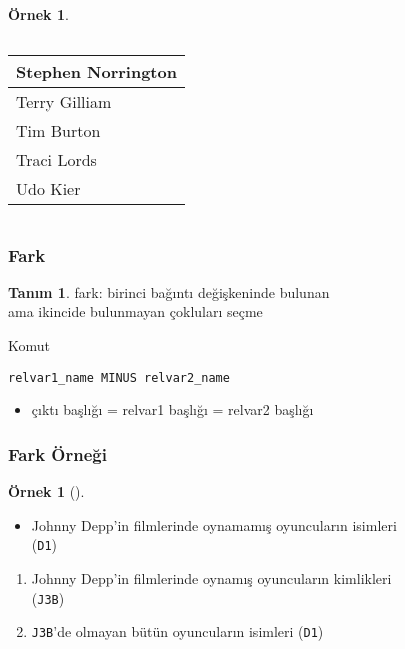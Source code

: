 \documentclass[dvipsnames]{beamer}
\theoremstyle{definition}
\newtheorem{tanim}[theorem]{Tanım}
\theoremstyle{example}
\newtheorem{ornek}[theorem]{Örnek}
\theoremstyle{plain}
\begin{document}
\begin{frame}[fragile]
\begin{ornek}
\begin{columns}[b]
      \begin{tiny}
      \begin{table}
        \begin{tabular}{|l|}\hline
Stephen Norrington   \\\hline
Terry Gilliam        \\\hline
Tim Burton           \\\hline
Traci Lords          \\\hline
Udo Kier             \\\hline
        \end{tabular}
      \end{table}
      \end{tiny}
    \end{columns}
  \end{ornek}
\end{frame}

\begin{frame}[fragile]
  \frametitle{Fark}

  \begin{tanim}
    \alert{fark}:  birinci bağıntı değişkeninde bulunan\\
      ama ikincide bulunmayan çokluları seçme
  \end{tanim}

  \pause
  \begin{block}{Komut}
    \begin{lstlisting}
relvar1_name MINUS relvar2_name
    \end{lstlisting}
  \end{block}

  \pause
  \begin{itemize}
    \item çıktı başlığı = relvar1 başlığı = relvar2 başlığı
  \end{itemize}
\end{frame}

\begin{frame}
  \frametitle{Fark Örneği}

  \begin{ornek}[]
    \begin{itemize}
      \item Johnny Depp'in filmlerinde oynamamış oyuncuların isimleri\\
        (\texttt{D1})
    \end{itemize}

    \pause
    \begin{enumerate}
      \item Johnny Depp'in filmlerinde oynamış oyuncuların kimlikleri\\
        (\texttt{J3B})

      \pause
      \item \texttt{J3B}'de olmayan bütün oyuncuların isimleri (\texttt{D1})
    \end{enumerate}
  \end{ornek}
\end{frame}
\end{document}
